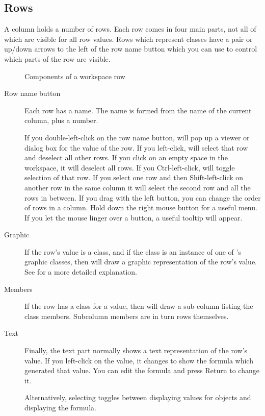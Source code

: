 \subsection{Rows}

A column holds a number of rows. Each row comes in four main parts, not all of
which are visible for all row values. Rows which represent classes have a pair
or up/down arrows to the left of the row name button which you can use to
control which parts of the row are visible.

\begin{figure}
\caption{Components of a workspace row}
\end{figure}

\begin{description}

\item[Row name button]
Each row has a name. The name is formed from the name of the current
column, plus a number.

If you double-left-click on the row name button, \nip{} will pop up a viewer
or dialog box for the value of the row. If you left-click, \nip{} will select
that row and deselect all other rows. If you click on an empty space
in the workspace, it will deselect all rows. If you
Ctrl-left-click, \nip{} will toggle selection of that row.  
If you select one row and then Shift-left-click on
another row in the same column it will select the second row and
all the rows in between. If you drag with the left button, you can change
the order of rows in a column.  Hold down the right mouse button for a useful
menu. If you let the mouse linger over a button, a useful tooltip will appear.

\item[Graphic]
If the row's value is a class, and if the class is an instance of one of
\nip{}'s graphic classes, then \nip{} will draw a graphic representation of
the row's value. See  for a more detailed explanation.

\item[Members]
If the row has a class for a value, then \nip{} will draw a sub-column listing
the class members. Subcolumn members are in turn rows themselves.

\item[Text]
Finally, the text part normally shows a text representation of the row's
value. If you left-click on the value, it changes to show the formula which
generated that value. You can edit the formula and press Return to change it.

Alternatively, selecting  toggles 
between displaying values for objects and displaying the formula.

\end{description}

